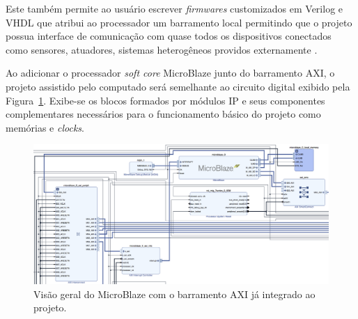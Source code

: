             Este também permite ao usuário escrever \textit{firmwares} customizados em Verilog e VHDL que atribui ao processador um barramento local permitindo que o projeto possua interface de comunicação com quase todos os dispositivos conectados como sensores, atuadores, sistemas heterogêneos providos externamente \citep{kranenburg2010mb}.
        
            Ao adicionar o processador \textit{soft core} MicroBlaze junto do barramento AXI, o projeto assistido pelo computado será semelhante ao circuito digital exibido pela Figura~\ref{fig:rb-mb}.
            Exibe-se os blocos formados por módulos IP e seus componentes complementares necessários para o funcionamento básico do projeto como memórias e \textit{clocks}.
            
            \begin{figure}[h] \centering
                \includegraphics[width=1.0\textwidth]{img/1-microblaze-axi.png}
                \caption{Visão geral do MicroBlaze com o barramento AXI já integrado ao projeto.}
                \label{fig:rb-mb}
            \end{figure}
        
        



